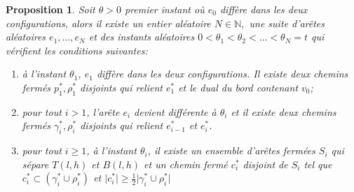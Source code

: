\documentclass[titlepage,a4paper,12pt]{article}
\newcounter{prop}
\newtheorem{chaine}[prop]{Proposition}
\begin{document}
\begin{chaine}
\label{chaine}
Soit $\theta>0$ premier instant où $e_0$ diffère dans les deux configurations, alors il existe un entier aléatoire $N\in \mathbb{N},$ une suite d'arêtes aléatoires $e_1,\dots,e_N$ et des instants aléatoires $0<\theta_1< \theta_2<\dots<\theta_N=t$ qui vérifient les conditions suivantes:

\begin{enumerate}[leftmargin =*]
\item à l'instant $\theta_1$, $e_1$ diffère dans les deux configurations. Il existe deux chemins fermés $p_1^*,\rho_1^*$ disjoints qui relient $e_1^*$ et le dual du bord contenant $v_0$;

\item pour tout $i>1$, l'arête $e_i$ devient différente à $\theta_i$ et il existe deux chemins fermés $\gamma_i^*,\rho_i^*$ disjoints qui relient $e_{i-1}^*$ et $e_i^*$.

\item pour tout $i\geqslant 1$, à l'instant $\theta_i$, il existe un ensemble d'arêtes fermées $S_i$ qui sépare $T(l,h)$ et $B(l,h)$ et un chemin fermé $c^*_i$ disjoint de $S_i$ tel que $c_i^* \subset (\gamma_i^*\cup \rho_i^*)$ et $\vert c_i^*\vert \geqslant \frac{1}{2} \vert \gamma_i^*\cup \rho_i^* \vert$
\end{enumerate}

\end{chaine}
\end{document}
